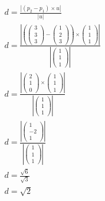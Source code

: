 \begin{align*}
    d = \frac{\left|\left(p_2 - p_1\right) \times u\right|}{\left|u\right|} \\
    d = \frac{\left|\left(\begin{pmatrix}
        3 \\ 3 \\ 3
    \end{pmatrix} - \begin{pmatrix}
        1 \\ 2 \\ 3
    \end{pmatrix}\right) \times \begin{pmatrix}
        1 \\ 1 \\ 1
    \end{pmatrix}\right|}{\left|\begin{pmatrix}
        1 \\ 1 \\ 1
    \end{pmatrix}\right|} \\
    d = \frac{\left|\begin{pmatrix}
        2 \\ 1 \\ 0
    \end{pmatrix} \times \begin{pmatrix}
        1 \\ 1 \\ 1
    \end{pmatrix}\right|}{\left|\begin{pmatrix}
        1 \\ 1 \\ 1
    \end{pmatrix}\right|} \\
    d = \frac{\left|\begin{pmatrix}
        1 \\ -2 \\ 1
    \end{pmatrix}\right|}{\left|\begin{pmatrix}
        1 \\ 1 \\ 1
    \end{pmatrix}\right|} \\
    d = \frac{\sqrt{6}}{\sqrt{3}} \\
    d = \sqrt{2} \\
\end{align*}

